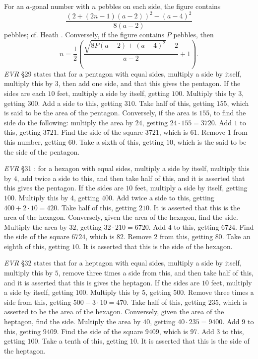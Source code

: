 For an $a$-gonal number with $n$ pebbles on each side, the figure contains 
\[
\frac{(2+(2n-1)(a-2))^2-(a-4)^2}{8(a-2)}
\]
pebbles; cf. Heath \cite[p.~516]{HGMII}.
Conversely, if the figure contains $P$ pebbles, then
\[
n=\frac{1}{2}\left( \frac{\sqrt{8P(a-2)+(a-4)^2}-2}{a-2}+1\right).
\]
{\em EVR} \S 29 \cite[pp.~164--167]{guillaumin} states that for a pentagon with equal sides, multiply a side by itself,
multiply this by $3$, then add one side, and that this gives the pentagon. If the sides are each $10$ feet, multiply
a side by itself, getting $100$. Multiply this by $3$, getting $300$. Add a side to this, getting $310$. Take
half of this, getting $155$, which is said to be the area of the pentagon. 
Conversely, if the area is $155$, to find the side do the following: multiply the area by $24$, getting
$24 \cdot 155 = 3720$. Add $1$ to this, getting $3721$. Find the side of the square $3721$, which is $61$. 
Remove $1$ from this number, getting $60$. Take a sixth of this, getting $10$, which is the said to be the side of the
pentagon.

{\em EVR} \S 31 \cite[pp.~172--177]{guillaumin}: for a hexagon with equal sides, multiply
a side by itself, multiply this by $4$, add twice a side to this, and then take half of this, and it is asserted
that this gives the pentagon. If the sides are $10$ feet, multiply a side by itself, getting $100$. 
Multiply this by $4$, getting $400$. Add twice a side to this, getting $400+2\cdot 10=420$. Take half
of this, getting $210$. It is asserted that this is the area of the hexagon. Conversely,
given the area of the hexagon, find the side. Multiply the area by $32$, getting $32 \cdot 210 = 6720$.
Add $4$ to this, getting $6724$. Find the side of the square $6724$, which is $82$. Remove $2$ from this,
getting $80$. Take an eighth of this, getting $10$. It is asserted that this is the side of the hexagon.

{\em EVR} \S 32 \cite[pp.~176--179]{guillaumin} states that for a heptagon with equal sides, multiply a side by
itself, multiply this by $5$, remove three times a side from this, and then take half of this, and it is asserted that
this is gives the heptagon. If the sides are $10$ feet,
multiply a side by itself, getting $100$. Multiply this by $5$, getting $500$. Remove three times a side from this,
getting $500-3\cdot 10=470$. Take half of this, getting $235$, which is asserted to be the area of the hexagon.
Conversely,
given the area of the heptagon, find the side. Multiply the area by $40$, getting $40 \cdot 235 = 9400$.
Add $9$ to this, getting $9409$. Find the side of the square $9409$, which is $97$. Add $3$ to this, getting $100$.
Take a tenth of this, getting $10$. It is asserted that this is the side of the heptagon.

